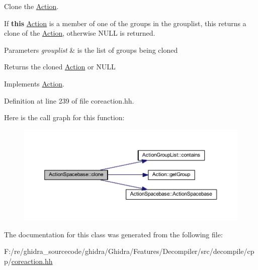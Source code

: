 Clone the \mbox{\hyperlink{class_action}{Action}}. 

If {\bfseries{this}} \mbox{\hyperlink{class_action}{Action}} is a member of one of the groups in the grouplist, this returns a clone of the \mbox{\hyperlink{class_action}{Action}}, otherwise N\+U\+LL is returned. 
\begin{DoxyParams}{Parameters}
{\em grouplist} & is the list of groups being cloned \\
\hline
\end{DoxyParams}
\begin{DoxyReturn}{Returns}
the cloned \mbox{\hyperlink{class_action}{Action}} or N\+U\+LL 
\end{DoxyReturn}


Implements \mbox{\hyperlink{class_action_af8242e41d09e5df52f97df9e65cc626f}{Action}}.



Definition at line 239 of file coreaction.\+hh.

Here is the call graph for this function\+:
\nopagebreak
\begin{figure}[H]
\begin{center}
\leavevmode
\includegraphics[width=350pt]{class_action_spacebase_a6e87ef6699ee74ba82a0d72caad1fd53_cgraph}
\end{center}
\end{figure}


The documentation for this class was generated from the following file\+:\begin{DoxyCompactItemize}
\item 
F\+:/re/ghidra\+\_\+sourcecode/ghidra/\+Ghidra/\+Features/\+Decompiler/src/decompile/cpp/\mbox{\hyperlink{coreaction_8hh}{coreaction.\+hh}}\end{DoxyCompactItemize}
